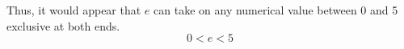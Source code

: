 \documentclass[letterpaper]{article}
\begin{document}
%                                                                                     
%                                                                                      
%                                                                                      
%    
\vspace{1cm}
\begin{adjustbox}{width=\textwidth}

\end{adjustbox}

\vspace{2cm}
Thus, it would appear that $e$ can take on any numerical value between
0 and 5 exclusive at both ends. 
\[ 0 < e < 5 \]
\end{document}
